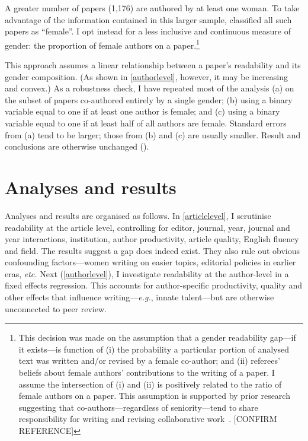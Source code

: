 

A greater number of papers (1,176) are authored by at least one woman. To take advantage of the information contained in this larger sample,  \citet{Blank1991} classified all such papers as ``female''. I opt instead for a less inclusive and continuous measure of gender: the proportion of female authors on a paper.\footnote{This decision was made on the assumption that a gender readability gap---if it exists---is function of (i) the probability a particular portion of analysed text was written and\slash or revised by a female co-author; and (ii) referees' beliefs about female authors' contributions to the writing of a paper. I assume the intersection of (i) and (ii) is positively related to the ratio of female authors on a paper. This assumption is supported by prior research suggesting that co-authors---regardless of seniority---tend to share responsibility for writing and revising collaborative work~\citep{Hart2000,Kumar2016}. [CONFIRM REFERENCE]}

This approach assumes a linear relationship between a paper's readability and its gender composition. (As shown in \autoref{authorlevel}, however, it may be increasing and convex.) As a robustness check, I have repeated most of the analysis (a) on the subset of papers co-authored entirely by a single gender; (b) using a binary variable equal to one if at least one author is female; and (c) using a binary variable equal to one if at least half of all authors are female. Standard errors from (a) tend to be larger; those from (b) and (c) are usually smaller. Result and conclusions are otherwise unchanged ().

\section{Analyses and results}
\label{results}

Analyses and results are organised as follows. In \autoref{articlelevel}, I scrutinise readability at the article level, controlling for editor, journal, year, journal and year interactions, institution, author productivity, article quality, English fluency and field. The results suggest a gap does indeed exist. They also rule out obvious confounding factors---women writing on easier topics, editorial policies in earlier eras, \emph{etc.} Next (\autoref{authorlevel}), I investigate readability at the author-level in a fixed effects regression. This accounts for author-specific productivity, quality and other effects that influence writing---\emph{e.g.}, innate talent---but are otherwise unconnected to peer review.


